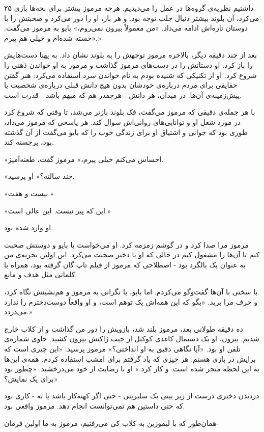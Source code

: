 ۲۵
داشتیم نظریه‌ی گروه‌ها در عمل را می‌دیدیم. هرچه مرموز بیشتر برای بچه‌ها بازی می‌کرد، آن بلوند بیشتر دنبال جلب توجه بود. و هر بار، او را دور می‌کرد و صحبتش را با دوستان تازه‌اش ادامه می‌داد.
«من معمولاً بیرون نمی‌روم،» بایو به مرموز می‌گفت. «خسته شده‌ام و خیلی هم پیرم.»

بعد از چند دقیقه دیگر، بالاخره مرموز توجهش را به بلوند نشان داد. به پهنا دست‌هایش را باز کرد. او دستانش را در دست‌های مرموز گذاشت و مرموز به او خواندن ذهنی را شروع کرد. او از تکنیکی که شنیده بودم به نام خواندن سرد استفاده می‌کرد: هنر گفتن حقایقی برای مردم درباره‌ی خودشان بدون هیچ دانش قبلی درباره‌ی شخصیت یا پیش‌زمینه‌ی آن‌ها. در میدان، هر دانش - هرچقدر هم که مبهم باشد - قدرت است.

با هر جمله‌ی دقیقی که مرموز می‌گفت، فک بلوند بازتر می‌شد، تا وقتی که شروع کرد در مورد شغل او و توانایی‌های روانی‌اش سوال کند. هر پاسخی که مرموز می‌داد، طوری بود که جوانی و اشتیاق او برای زندگی خوب را که بایو می‌گفت از آن گذشته بود، برجسته کند.

«احساس می‌کنم خیلی پیرم،» مرموز گفت، طعنه‌آمیز.

«چند سالته؟» او پرسید.

«بیست و هفت.»

«این که پیر نیست. این عالی است.»

او وارد شده بود.

مرموز مرا صدا کرد و در گوشم زمزمه کرد. او می‌خواست با بایو و دوستش صحبت کنم تا آن‌ها را مشغول کنم در حالی که او با دختر صحبت می‌کرد. این اولین تجربه‌ی من به عنوان یک بالگرد بود - اصطلاحی که مرموز از فیلم تاپ ‌گان گرفته بود، همراه با کلماتی مثل هدف و مانع.

با سختی با آن‌ها گفت‌وگو می‌کردم. اما بایو، با نگرانی به مرموز و هم‌نشینش نگاه کرد، و حرف مرا برید. «بگو که این همه‌اش یک توهم است، و او واقعاً دوست‌دخترم را ندارد می‌دزدد.»

ده دقیقه طولانی بعد، مرموز بلند شد، بازویش را دور من گذاشت و از کلاب خارج شدیم. بیرون، او یک دستمال کاغذی کوکتل از جیب ژاکتش بیرون کشید. حاوی شماره‌ی تلفن او بود. «آیا نگاهی دقیق به او انداختی؟» مرموز پرسید. «این چیزی است که برایش در بازی هستم. هر چیزی که یاد گرفتم برای امشب استفاده کردم. همه‌ی این‌ها به این لحظه منجر شده است. و کار کرد.» او با رضایت از خود می‌درخشید. «چطور بود برای یک نمایش؟»

دزدیدن دختری درست از زیر بینی یک سلبریتی - حتی اگر کهنه‌کار باشد یا نه - کاری بود که حتی داستین هم نمی‌توانست انجام دهد. مرموز واقعی بود.

همان‌طور که با لیموزین به کلاب کی می‌رفتیم، مرموز به ما اولین فرمان-